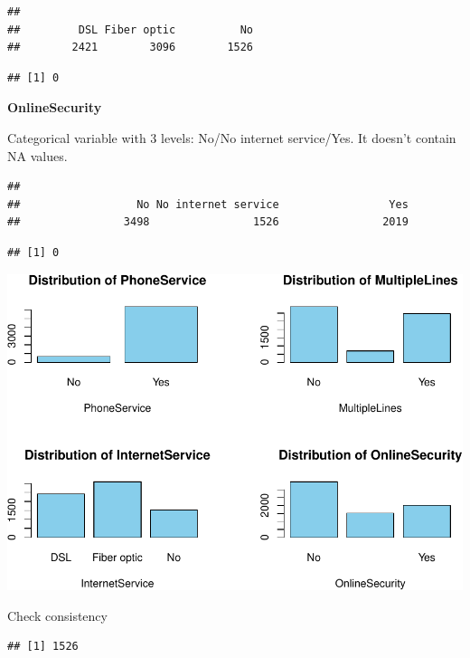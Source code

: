 \documentclass[
  twoside]{article}
\newenvironment{Shaded}{\begin{snugshade}}{\end{snugshade}}
\newcommand{\FunctionTok}[1]{\textcolor[rgb]{0.00,0.00,0.00}{#1}}
\newcommand{\NormalTok}[1]{#1}
\newcommand{\SpecialCharTok}[1]{\textcolor[rgb]{0.00,0.00,0.00}{#1}}
\newcommand{\StringTok}[1]{\textcolor[rgb]{0.31,0.60,0.02}{#1}}
\begin{document}
\begin{verbatim}
## 
##         DSL Fiber optic          No 
##        2421        3096        1526
\end{verbatim}

\begin{verbatim}
## [1] 0
\end{verbatim}

\textbf{OnlineSecurity}

Categorical variable with 3 levels: No/No internet service/Yes. It
doesn't contain NA values.

\begin{verbatim}
## 
##                  No No internet service                 Yes 
##                3498                1526                2019
\end{verbatim}

\begin{verbatim}
## [1] 0
\end{verbatim}

\includegraphics{Assigment2_files/figure-latex/unnamed-chunk-16-1.pdf}

Check consistency

\begin{Shaded}
\end{Shaded}

\begin{verbatim}
## [1] 1526
\end{verbatim}
\end{document}

